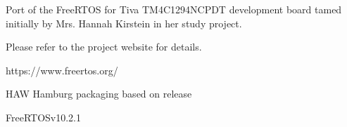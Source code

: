 Port of the Free\+RTOS for Tiva TM4\+C1294\+NCPDT development board tamed initially by Mrs. Hannah Kirstein in her study project.

Please refer to the project website for details. \begin{DoxyVerb}https://www.freertos.org/
\end{DoxyVerb}
 HAW Hamburg packaging based on release \begin{DoxyVerb}FreeRTOSv10.2.1
\end{DoxyVerb}
 